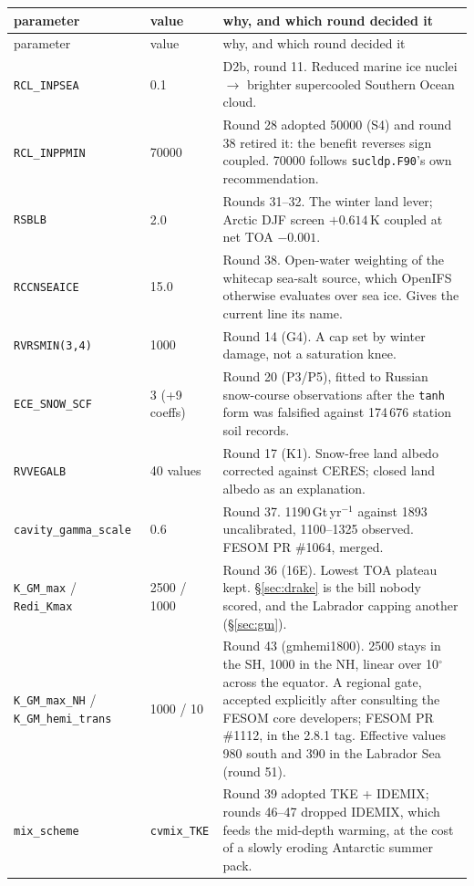 \documentclass[10pt]{article}
\begin{document}
{\small
\begin{longtable}{p{4.0cm}p{2.3cm}p{9.4cm}}
\toprule
parameter & value & why, and which round decided it \\
\midrule
\endfirsthead
\toprule
parameter & value & why, and which round decided it \\
\midrule
\endhead
\texttt{RCL\_INPSEA} & 0.1 & D2b, round 11. Reduced marine ice nuclei $\to$ brighter
supercooled Southern Ocean cloud. \\
\texttt{RCL\_INPPMIN} & 70000 & Round 28 adopted 50000 (S4) and round 38 retired it: the
benefit reverses sign coupled. 70000 follows \texttt{sucldp.F90}'s own recommendation. \\
\texttt{RSBLB} & 2.0 & Rounds 31--32. The winter land lever; Arctic DJF screen $+0.614$\,K
coupled at net TOA $-0.001$. \\
\texttt{RCCNSEAICE} & 15.0 & Round 38. Open-water weighting of the whitecap sea-salt source,
which OpenIFS otherwise evaluates over sea ice. Gives the current line its name. \\
\texttt{RVRSMIN(3,4)} & 1000 & Round 14 (G4). A cap set by winter damage, not a saturation
knee. \\
\texttt{ECE\_SNOW\_SCF} & 3 (+9 coeffs) & Round 20 (P3/P5), fitted to Russian snow-course
observations after the \texttt{tanh} form was falsified against 174\,676 station soil
records. \\
\texttt{RVVEGALB} & 40 values & Round 17 (K1). Snow-free land albedo corrected against
CERES; closed land albedo as an explanation. \\
\texttt{cavity\_gamma\_scale} & 0.6 & Round 37. 1190\,Gt\,yr$^{-1}$ against 1893
uncalibrated, 1100--1325 observed. FESOM PR \#1064, merged. \\
\texttt{K\_GM\_max} / \texttt{Redi\_Kmax} & 2500 / 1000 & Round 36 (16E). Lowest TOA plateau
kept. \S\ref{sec:drake} is the bill nobody scored, and the Labrador capping another
(\S\ref{sec:gm}). \\
\texttt{K\_GM\_max\_NH} / \texttt{K\_GM\_hemi\_trans} & 1000 / 10 & Round 43 (gmhemi1800).
2500 stays in the SH, 1000 in the NH, linear over 10$^\circ$ across the equator. A regional
gate, accepted explicitly after consulting the FESOM core developers; FESOM PR \#1112, in the
2.8.1 tag. Effective values 980 south and 390 in the Labrador Sea (round 51). \\
\texttt{mix\_scheme} & \texttt{cvmix\_TKE} & Round 39 adopted TKE + IDEMIX; rounds 46--47 dropped
IDEMIX, which feeds the mid-depth warming, at the cost of a slowly eroding Antarctic summer pack. \\

\end{longtable}}
\end{document}
